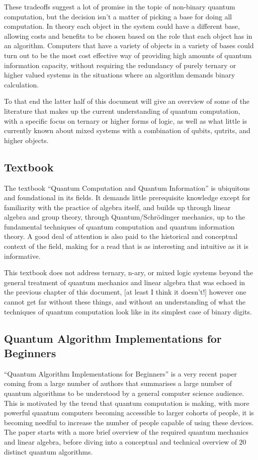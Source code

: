 These tradeoffs suggest a lot of promise in the topic of non-binary quantum computation, but the decision isn't a matter of picking a base for doing all computation. In theory each object in the system could have a different base, allowing costs and benefits to be chosen based on the role that each object has in an algorithm. Computers that have a variety of objects in a variety of bases could turn out to be the most cost effective way of providing high amounts of quantum information capacity, without requiring the redundancy of purely ternary or higher valued systems in the situations where an algorithm demands binary calculation.

To that end the latter half of this document will give an overview of some of the literature that makes up the current understanding of quantum computation, with a specific focus on ternary or higher forms of logic, as well as what little is currently known about mixed systems with a combination of qubits, qutrits, and higher objects.

\subsection{Textbook}
The textbook ``Quantum Computation and Quantum Information''\cite{textbook} is ubiquitous and foundational in its fields. It demands little prerequisite knowledge except for familiarity with the practice of algebra itself, and builds up through linear algebra and group theory, through Quantum/Schrödinger mechanics, up to the fundamental techniques of quantum computation and quantum information theory. A good deal of attention is also paid to the historical and conceptual context of the field, making for a read that is as interesting and intuitive as it is informative.

This textbook does not address ternary, n-ary, or mixed logic systems beyond the general treatment of quantum mechanics and linear algebra that was echoed in the previous chapter of this document, [at least I think it doesn't!] however one cannot get far without these things, and without an understanding of what the techniques of quantum computation look like in its simplest case of binary digits.

\subsection{Quantum Algorithm Implementations for Beginners}
``Quantum Algorithm Implementations for Beginners''\cite{algos} is a very recent paper coming from a large number of authors that summarises a large number of quantum algorithms to be understood by a general computer science audience. This is motivated by the trend that quantum computation is making, with more powerful quantum computers becoming accessible to larger cohorts of people, it is becoming needful to increase the number of people capable of using these devices. The paper starts with a more brief overview of the required quantum mechanics and linear algebra, before diving into a conceptual and technical overview of 20 distinct quantum algorithms.


